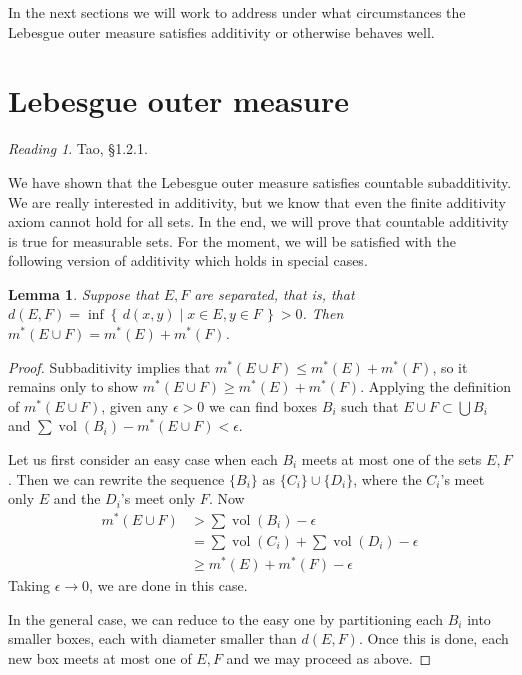 \documentclass[11pt,oneside]{amsbook}
\newcommand{\set}[1]{\left\{\,#1\,\right\}}
\DeclareMathOperator{\vol}{vol}
\theoremstyle{definition}
\theoremstyle{plain}
\newtheorem{lem}[thm]{Lemma}
\theoremstyle{definition}
\theoremstyle{remark}
\newtheorem*{reading}{Reading}
\numberwithin{equation}{section}
\numberwithin{figure}{section}
\begin{document}
In the next sections we will work to address under what circumstances the Lebesgue outer measure satisfies additivity or otherwise behaves well.

\newpage
\section{Lebesgue outer measure}

\begin{reading}
  Tao, \S 1.2.1.
\end{reading}

We have shown that the Lebesgue outer measure satisfies countable subadditivity. We are really interested in additivity, but we know that even the finite additivity axiom cannot hold for all sets. In the end, we will prove that countable additivity is true for measurable sets. For the moment, we will be satisfied with the following version of additivity which holds in special cases.


\begin{lem}
  Suppose that $E,F$ are separated, that is, that $d(E,F)=\inf\set{d(x,y)\mid x\in E, y\in F}>0$. Then $m^*(E\cup F)=m^*(E)+m^*(F)$.
\end{lem}

\begin{proof}
  Subbaditivity implies that $m^*(E\cup F)\leq m^*(E)+m^*(F)$, so it remains only to show $m^*(E\cup F)\geq m^*(E)+m^*(F)$. Applying the definition of $m^*(E\cup F)$, given any $\epsilon>0$ we can find boxes $B_i$ such that $E\cup F\subset\bigcup B_i$ and $\sum\vol(B_i)-m^*(E\cup F)<\epsilon$.

  Let us first consider an easy case when each $B_i$ meets at most one of the sets $E,F$. Then we can rewrite the sequence $\{B_i\}$ as $\{C_i\}\cup\{D_i\}$, where the $C_i$'s meet only $E$ and the $D_i$'s meet only $F$. Now
  \begin{align*}
    m^*(E\cup F)&>\sum\vol(B_i)-\epsilon\\
                &=\sum\vol(C_i)+\sum\vol(D_i)-\epsilon\\
                &\geq m^*(E)+m^*(F)-\epsilon
  \end{align*}
  Taking $\epsilon\to0$, we are done in this case.

  In the general case, we can reduce to the easy one by partitioning each $B_i$ into smaller boxes, each with diameter smaller than $d(E,F)$. Once this is done, each new box meets at most one of $E,F$ and we may proceed as above.
\end{proof}
\end{document}
